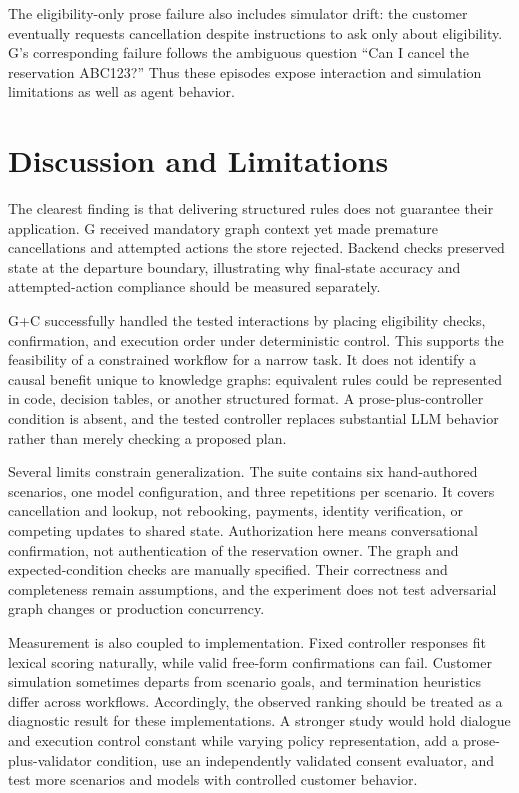 \documentclass[11pt]{article}
\begin{document}
The eligibility-only prose failure also includes simulator drift: the customer eventually requests cancellation despite instructions to ask only about eligibility. G's corresponding failure follows the ambiguous question ``Can I cancel the reservation ABC123?'' Thus these episodes expose interaction and simulation limitations as well as agent behavior.

\section{Discussion and Limitations}
The clearest finding is that delivering structured rules does not guarantee their application. G received mandatory graph context yet made premature cancellations and attempted actions the store rejected. Backend checks preserved state at the departure boundary, illustrating why final-state accuracy and attempted-action compliance should be measured separately.

G+C successfully handled the tested interactions by placing eligibility checks, confirmation, and execution order under deterministic control. This supports the feasibility of a constrained workflow for a narrow task. It does not identify a causal benefit unique to knowledge graphs: equivalent rules could be represented in code, decision tables, or another structured format. A prose-plus-controller condition is absent, and the tested controller replaces substantial LLM behavior rather than merely checking a proposed plan.

Several limits constrain generalization. The suite contains six hand-authored scenarios, one model configuration, and three repetitions per scenario. It covers cancellation and lookup, not rebooking, payments, identity verification, or competing updates to shared state. Authorization here means conversational confirmation, not authentication of the reservation owner. The graph and expected-condition checks are manually specified. Their correctness and completeness remain assumptions, and the experiment does not test adversarial graph changes or production concurrency.

Measurement is also coupled to implementation. Fixed controller responses fit lexical scoring naturally, while valid free-form confirmations can fail. Customer simulation sometimes departs from scenario goals, and termination heuristics differ across workflows. Accordingly, the observed ranking should be treated as a diagnostic result for these implementations. A stronger study would hold dialogue and execution control constant while varying policy representation, add a prose-plus-validator condition, use an independently validated consent evaluator, and test more scenarios and models with controlled customer behavior.
\end{document}

